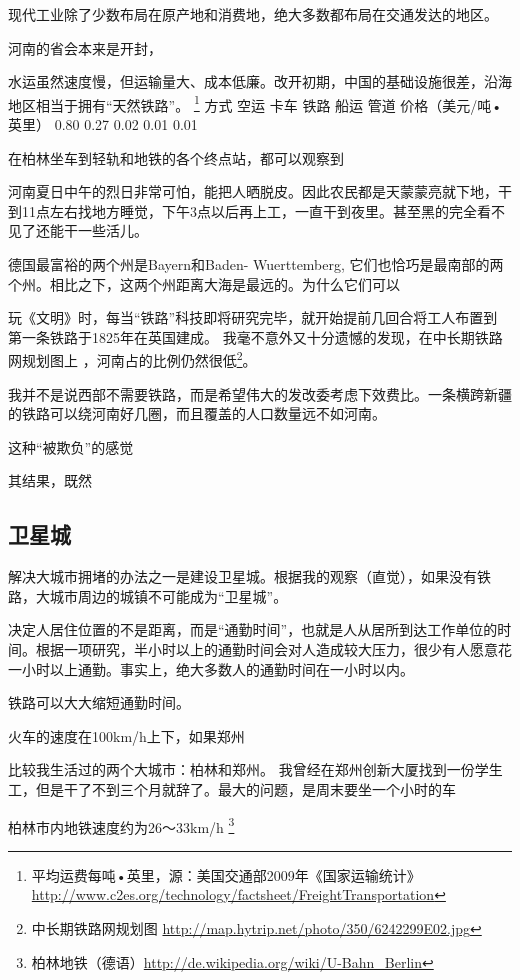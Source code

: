 现代工业除了少数布局在原产地和消费地，绝大多数都布局在交通发达的地区。

河南的省会本来是开封，

水运虽然速度慢，但运输量大、成本低廉。改开初期，中国的基础设施很差，沿海地区相当于拥有“天然铁路”。 \footnote{平均运费每吨•英里，源：美国交通部2009年《国家运输统计》 \url{http://www.c2es.org/technology/factsheet/FreightTransportation}}
方式	空运	卡车	铁路	船运	管道
价格（美元/吨•英里）	0.80	0.27	0.02	0.01	0.01

在柏林坐车到轻轨和地铁的各个终点站，都可以观察到

河南夏日中午的烈日非常可怕，能把人晒脱皮。因此农民都是天蒙蒙亮就下地，干到11点左右找地方睡觉，下午3点以后再上工，一直干到夜里。甚至黑的完全看不见了还能干一些活儿。

德国最富裕的两个州是Bayern和Baden- Wuerttemberg, 它们也恰巧是最南部的两个州。相比之下，这两个州距离大海是最远的。为什么它们可以

玩《文明》时，每当“铁路”科技即将研究完毕，就开始提前几回合将工人布置到
第一条铁路于1825年在英国建成。
我毫不意外又十分遗憾的发现，在中长期铁路网规划图上 ，河南占的比例仍然很低\footnote{中长期铁路网规划图  \url{http://map.hytrip.net/photo/350/6242299E02.jpg}}。

我并不是说西部不需要铁路，而是希望伟大的发改委考虑下效费比。一条横跨新疆的铁路可以绕河南好几圈，而且覆盖的人口数量远不如河南。

这种“被欺负”的感觉

其结果，既然

\subsection{卫星城}
解决大城市拥堵的办法之一是建设卫星城。根据我的观察（直觉），如果没有铁路，大城市周边的城镇不可能成为“卫星城”。

决定人居住位置的不是距离，而是“通勤时间”，也就是人从居所到达工作单位的时间。根据一项研究，半小时以上的通勤时间会对人造成较大压力，很少有人愿意花一小时以上通勤。事实上，绝大多数人的通勤时间在一小时以内。

铁路可以大大缩短通勤时间。

火车的速度在100km/h上下，如果郑州

比较我生活过的两个大城市：柏林和郑州。
我曾经在郑州创新大厦找到一份学生工，但是干了不到三个月就辞了。最大的问题，是周末要坐一个小时的车

柏林市内地铁速度约为26～33km/h \footnote{柏林地铁（德语）\url{http://de.wikipedia.org/wiki/U-Bahn_Berlin}}

